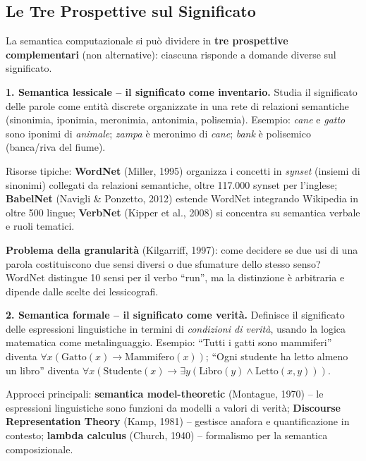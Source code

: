 \documentclass[12pt,a4paper]{article}
\begin{document}
\subsection{Le Tre Prospettive sul Significato}

\begin{defbox}
La semantica computazionale si pu\`o dividere in \textbf{tre prospettive complementari} (non alternative): ciascuna risponde a domande diverse sul significato.
\end{defbox}

\textbf{1. Semantica lessicale -- il significato come inventario.} Studia il significato delle parole come entit\`a discrete organizzate in una rete di relazioni semantiche (sinonimia, iponimia, meronimia, antonimia, polisemia). Esempio: \textit{cane} e \textit{gatto} sono iponimi di \textit{animale}; \textit{zampa} \`e meronimo di \textit{cane}; \textit{bank} \`e polisemico (banca/riva del fiume).

Risorse tipiche: \textbf{WordNet} (Miller, 1995) organizza i concetti in \emph{synset} (insiemi di sinonimi) collegati da relazioni semantiche, oltre 117.000 synset per l'inglese; \textbf{BabelNet} (Navigli \& Ponzetto, 2012) estende WordNet integrando Wikipedia in oltre 500 lingue; \textbf{VerbNet} (Kipper et al., 2008) si concentra su semantica verbale e ruoli tematici.

\begin{quizbox}
\textbf{Problema della granularit\`a} (Kilgarriff, 1997): come decidere se due usi di una parola costituiscono due sensi diversi o due sfumature dello stesso senso? WordNet distingue 10 sensi per il verbo ``run'', ma la distinzione \`e arbitraria e dipende dalle scelte dei lessicografi.
\end{quizbox}

\textbf{2. Semantica formale -- il significato come verit\`a.} Definisce il significato delle espressioni linguistiche in termini di \emph{condizioni di verit\`a}, usando la logica matematica come metalinguaggio. Esempio: ``Tutti i gatti sono mammiferi'' diventa $\forall x(\text{Gatto}(x) \to \text{Mammifero}(x))$; ``Ogni studente ha letto almeno un libro'' diventa $\forall x(\text{Studente}(x) \to \exists y(\text{Libro}(y) \land \text{Letto}(x,y)))$.

Approcci principali: \textbf{semantica model-theoretic} (Montague, 1970) -- le espressioni linguistiche sono funzioni da modelli a valori di verit\`a; \textbf{Discourse Representation Theory} (Kamp, 1981) -- gestisce anafora e quantificazione in contesto; \textbf{lambda calculus} (Church, 1940) -- formalismo per la semantica composizionale.
\end{document}
